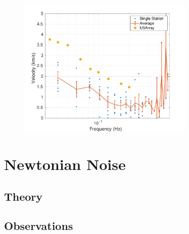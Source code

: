 \documentclass [12pt, proquest]{uwthesis}[2019]
\begin{document}
\begin{figure}%
\begin{center}
\includegraphics[width=0.75\textwidth]{RayleighDispersion.pdf}
\caption{}
\label{Phase_Livingston}
\end{center}
\end{figure}

\section{Newtonian Noise}
\subsection{Theory}
\subsection{Observations}



\printendnotes
\nocite{*}   


\end{document}
